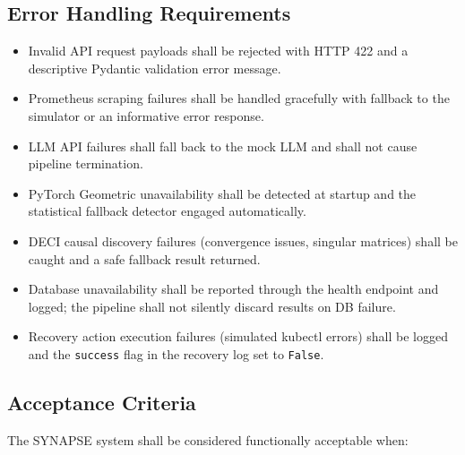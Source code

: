 \documentclass[11pt,a4paper]{article}
\begin{document}

\subsection{Error Handling Requirements}

\begin{itemize}
    \item Invalid API request payloads shall be rejected with HTTP 422 and a descriptive Pydantic validation error message.
    \item Prometheus scraping failures shall be handled gracefully with fallback to the simulator or an informative error response.
    \item LLM API failures shall fall back to the mock LLM and shall not cause pipeline termination.
    \item PyTorch Geometric unavailability shall be detected at startup and the statistical fallback detector engaged automatically.
    \item DECI causal discovery failures (convergence issues, singular matrices) shall be caught and a safe fallback result returned.
    \item Database unavailability shall be reported through the health endpoint and logged; the pipeline shall not silently discard results on DB failure.
    \item Recovery action execution failures (simulated kubectl errors) shall be logged and the \texttt{success} flag in the recovery log set to \texttt{False}.
\end{itemize}


\subsection{Acceptance Criteria}

The SYNAPSE system shall be considered functionally acceptable when:
\end{document}
